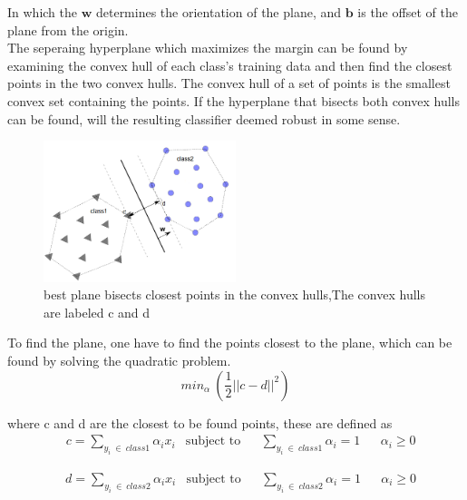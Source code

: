 In which the $\mathbf{w}$ determines the orientation of the plane, and $\mathbf{b}$ is the offset of the plane from the origin. \\
 
The seperaing hyperplane which maximizes the margin can be found by examining the convex hull of each class’s training data  and then find the closest points in the two convex hulls. The convex hull of a set of points is the
smallest convex set containing the points.  If the hyperplane that bisects both convex hulls can be found, will the resulting classifier deemed robust in some sense. 

\begin{figure}[H]
\centering
\includegraphics[width = 0.5\textwidth]{img/convex_hull.png}
\caption{best plane bisects closest points in the convex hulls,The convex hulls are labeled c and d}
\label{fig::convex_hull}
\end{figure}  

To find  the plane, one have to find the points closest to the plane, which can be found by solving the quadratic problem. \\ 

\begin{equation}
min_\alpha~\left(\frac{1}{2} ||c-d||^2\right)
\end{equation}

where c and d are the closest to be found points, these are defined as 
\begin{equation}
\begin{aligned}
&c = \sum_{y_i~\in~class1} \alpha_ix_i  
& \text{subject to}
&& \sum_{y_i~\in~class1}\alpha_i =1 
&& \alpha_i \geq 0
\end{aligned} 
\end{equation}

\begin{equation}
\begin{aligned}
&d = \sum_{y_i~\in~class2} \alpha_ix_i  
& \text{subject to}
&& \sum_{y_i~\in~class2}\alpha_i =1 
&& \alpha_i \geq 0
\end{aligned} 
\end{equation}


